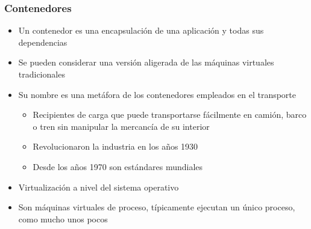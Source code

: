 \documentclass[ucs]{beamer}
\begin{document}
\begin{frame}[fragile]
\frametitle{Contenedores}
\begin{itemize}
\item
Un contenedor es una encapsulación de una aplicación y todas sus dependencias


\item
Se pueden considerar
una versión aligerada de las máquinas virtuales tradicionales

\item
Su nombre es una metáfora de los contenedores empleados en el transporte

\begin{itemize}
\item
Recipientes de carga que puede transportarse fácilmente en camión, barco
o tren sin manipular la mercancía de su interior
\item
Revolucionaron la industria en los años 1930
\item
Desde los años 1970 son estándares mundiales
\end{itemize}



\item
Virtualización a nivel del sistema operativo

\item
Son máquinas virtuales de proceso, típicamente ejecutan un único proceso,
como mucho unos pocos


\end{itemize}

\end{frame}

\end{document}
